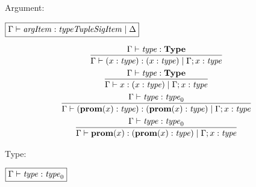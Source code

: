 Argument:

$\fbox{$\Gamma \vdash \mathit{argItem}: \mathit{typeTupleSigItem} \mid \Delta$}$

\begin{gather*}
  \infer{\Gamma \vdash (x: \mathit{type}): (x: \mathit{type}) \mid \Gamma; x: \mathit{type}}{
    \Gamma \vdash \mathit{type}: \mathbf{Type}
  }
  \\
  \infer{\Gamma \vdash x: (x: \mathit{type}) \mid \Gamma; x: \mathit{type}}{
    \Gamma \vdash \mathit{type}: \mathbf{Type}
  }
  \\
  \infer{\Gamma \vdash (\mathbf{prom}(x): \mathit{type}): (\mathbf{prom}(x): \mathit{type}) \mid \Gamma; x: \mathit{type}}{
    \Gamma \vdash \mathit{type}: \mathit{type}_0
  }
  \\
  \infer{\Gamma \vdash \mathbf{prom}(x): (\mathbf{prom}(x): \mathit{type}) \mid \Gamma; x: \mathit{type}}{
    \Gamma \vdash \mathit{type}: \mathit{type}_0
  }
\end{gather*}

Type:

$\fbox{$\Gamma \vdash \mathit{type}: \mathit{type}_0$}$

